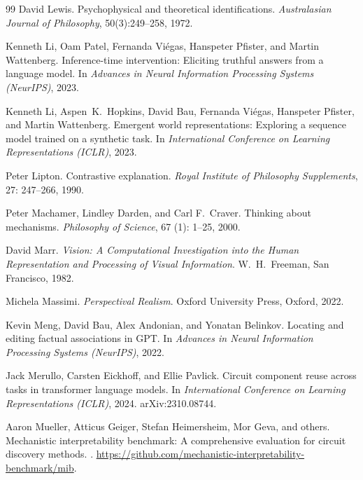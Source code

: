 \documentclass{article}
\begin{document}
\begin{thebibliography}{99}
David Lewis.
\newblock Psychophysical and theoretical identifications.
\newblock \emph{Australasian Journal of Philosophy}, 50(3):249--258, 1972.

Kenneth Li, Oam Patel, Fernanda Vi\'{e}gas, Hanspeter Pfister, and Martin Wattenberg.
\newblock Inference-time intervention: Eliciting truthful answers from a
  language model.
\newblock In \emph{Advances in Neural Information Processing Systems (NeurIPS)}, 2023.

Kenneth Li, Aspen~K.\ Hopkins, David Bau, Fernanda Vi\'{e}gas, Hanspeter
  Pfister, and Martin Wattenberg.
\newblock Emergent world representations: Exploring a sequence model trained on
  a synthetic task.
\newblock In \emph{International Conference on Learning Representations (ICLR)}, 2023.

Peter Lipton.
\newblock Contrastive explanation.
\newblock \emph{Royal Institute of Philosophy Supplements}, 27:
  247--266, 1990.

Peter Machamer, Lindley Darden, and Carl F.\ Craver.
\newblock Thinking about mechanisms.
\newblock \emph{Philosophy of Science}, 67 (1): 1--25, 2000.

David Marr.
\newblock \emph{Vision: A Computational Investigation into the Human
  Representation and Processing of Visual Information}.
\newblock W.\ H.\ Freeman, San Francisco, 1982.

Michela Massimi.
\newblock \emph{Perspectival Realism}.
\newblock Oxford University Press, Oxford, 2022.

Kevin Meng, David Bau, Alex Andonian, and Yonatan Belinkov.
\newblock Locating and editing factual associations in {GPT}.
\newblock In \emph{Advances in Neural Information Processing Systems (NeurIPS)}, 2022.

Jack Merullo, Carsten Eickhoff, and Ellie Pavlick.
\newblock Circuit component reuse across tasks in transformer language models.
\newblock In \emph{International Conference on Learning Representations
  (ICLR)}, 2024.
\newblock arXiv:2310.08744.

Aaron Mueller, Atticus Geiger, Stefan Heimersheim, Mor Geva, and others.
\newblock Mechanistic interpretability benchmark: A comprehensive evaluation
  for circuit discovery methods.
.
\newblock \url{https://github.com/mechanistic-interpretability-benchmark/mib}.


\end{thebibliography}
\end{document}
